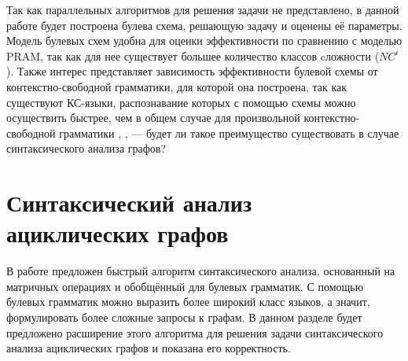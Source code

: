 \documentclass{spbau-diploma}
\begin{document}
Так как параллельных алгоритмов для решения задачи не представлено, в данной работе будет построена булева схема, решающую задачу и оценены её параметры. Модель булевых схем удобна для оценки эффективности по сравнению с моделью PRAM, так как для нее существует большее количество классов cложности (${NC}^i$). Также интерес представляет зависимость эффективности булевой схемы от контекстно-свободной грамматики, для которой она построена, так как существуют КС-языки, распознавание которых с помощью схемы можно осуществить быстрее, чем в общем случае для произвольной контекстно-свободной грамматики \cite{Ibarra}, \cite{Dymond}, \cite{LLComp} --- будет ли такое преимущество существовать в случае синтаксического анализа графов?

\section{Синтаксический анализ ациклических графов}
В работе \cite{OkhotinParse} предложен быстрый алгоритм синтаксического
анализа, основанный на матричных операциях и обобщённый для
булевых грамматик. С помощью булевых грамматик можно выразить
более широкий класс языков, а значит, формулировать более
сложные запросы к графам.  В данном разделе будет предложено
расширение этого алгоритма для решения задачи синтаксического
анализа ациклических графов и показана его корректность. 
\end{document}
